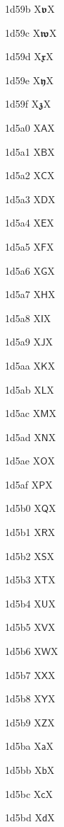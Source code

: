 \documentclass[11pt]{article}
\begin{document}
1d59b X{\ensuremath{\mathbffrak{v}}}X

1d59c X{\ensuremath{\mathbffrak{w}}}X

1d59d X{\ensuremath{\mathbffrak{x}}}X

1d59e X{\ensuremath{\mathbffrak{y}}}X

1d59f X{\ensuremath{\mathbffrak{z}}}X

1d5a0 X{\ensuremath{\mathsf{A}}}X

1d5a1 X{\ensuremath{\mathsf{B}}}X

1d5a2 X{\ensuremath{\mathsf{C}}}X

1d5a3 X{\ensuremath{\mathsf{D}}}X

1d5a4 X{\ensuremath{\mathsf{E}}}X

1d5a5 X{\ensuremath{\mathsf{F}}}X

1d5a6 X{\ensuremath{\mathsf{G}}}X

1d5a7 X{\ensuremath{\mathsf{H}}}X

1d5a8 X{\ensuremath{\mathsf{I}}}X

1d5a9 X{\ensuremath{\mathsf{J}}}X

1d5aa X{\ensuremath{\mathsf{K}}}X

1d5ab X{\ensuremath{\mathsf{L}}}X

1d5ac X{\ensuremath{\mathsf{M}}}X

1d5ad X{\ensuremath{\mathsf{N}}}X

1d5ae X{\ensuremath{\mathsf{O}}}X

1d5af X{\ensuremath{\mathsf{P}}}X

1d5b0 X{\ensuremath{\mathsf{Q}}}X

1d5b1 X{\ensuremath{\mathsf{R}}}X

1d5b2 X{\ensuremath{\mathsf{S}}}X

1d5b3 X{\ensuremath{\mathsf{T}}}X

1d5b4 X{\ensuremath{\mathsf{U}}}X

1d5b5 X{\ensuremath{\mathsf{V}}}X

1d5b6 X{\ensuremath{\mathsf{W}}}X

1d5b7 X{\ensuremath{\mathsf{X}}}X

1d5b8 X{\ensuremath{\mathsf{Y}}}X

1d5b9 X{\ensuremath{\mathsf{Z}}}X

1d5ba X{\ensuremath{\mathsf{a}}}X

1d5bb X{\ensuremath{\mathsf{b}}}X

1d5bc X{\ensuremath{\mathsf{c}}}X

1d5bd X{\ensuremath{\mathsf{d}}}X
\end{document}
